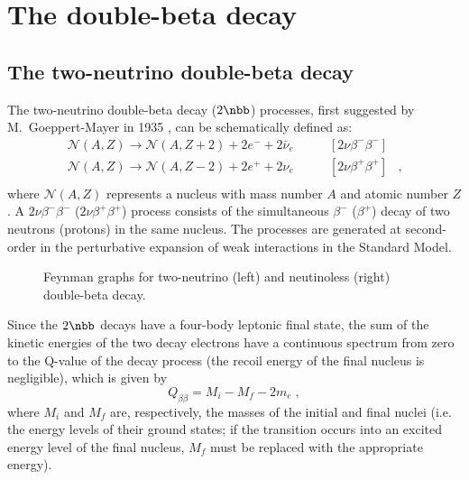 \chapter{The double-beta decay}
\section*{The two-neutrino double-beta decay}
The two-neutrino double-beta decay ($2\nbb$) processes, first suggested by M.~Goeppert-Mayer in 1935 \cite{PhysRev.48.512}, can be schematically defined as:
\[\begin{array}{lrl}
		\mathcal{N}(A,Z)\longrightarrow \mathcal{N}(A,Z+2)+2e^-+2\bar{\nu}_e & \qquad [2\nu\beta^-\beta^-] & \\
		\mathcal{N}(A,Z)\longrightarrow \mathcal{N}(A,Z-2)+2e^++2\nu_e & \qquad [2\nu\beta^+\beta^+] & ,\\
\end{array}\]
where $\mathcal{N}(A,Z)$ represents a nucleus with mass number $A$ and atomic number $Z$. A $2\nu\beta^-\beta^-$ ($2\nu\beta^+\beta^+$) process consists of the simultaneous $\beta^-$ ($\beta^+$) decay of two neutrons (protons) in the same nucleus. The processes are generated at second-order in the perturbative expansion of weak interactions in the Standard Model.
\begin{figure}
	\centering%
	\makebox[\textwidth]{%
	}%
	\caption{Feynman graphs for two-neutrino (left) and neutinoless (right) double-beta decay.}
	\label{fig:nbbfey}
\end{figure}

Since the $2\nbb$ decays have a four-body leptonic final state, the sum of the kinetic energies of the two decay electrons have a continuous spectrum from zero to the Q-value of the decay process (the recoil energy of the final nucleus is negligible), which is given by
\[Q_{\beta\beta}=M_i-M_f-2m_e\;,\]
where $M_i$ and $M_f$ are, respectively, the masses of the initial and final nuclei (i.e. the energy levels of their ground states; if the transition occurs into an excited energy level of the final nucleus, $M_f$ must be replaced with the appropriate energy).

